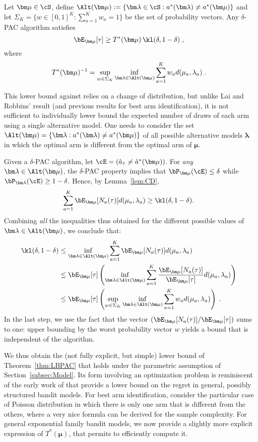 \documentclass[proc]{edpsmath}
\begin{document}
	\begin{theorem}\label{thm:LBPAC} Let $\bm \mu \in \cS$, define $\Alt(\bm \mu) := \{ \bm \lambda \in \cS : a^*(\bm \lambda) \neq a^*(\bm \mu)\}$ and let  $\Sigma_K = \big\{ w \in [0,1]^K : \sum_{a=1}^K w_a =1\big\}$ be the set of probability vectors. Any $\delta$-PAC algorithm satisfies 
		\[\bE_{\bm \mu}[\tau] \geq T^*(\bm \mu)\, \kl(\delta,1-\delta)\;,\]
		where
		\[T^*(\bm \mu)^{-1} = \sup_{w \in \Sigma_K} \inf_{\bm \lambda \in \Alt(\bm \mu)} \sum_{a=1}^K w_a d (\mu_a,\lambda_a)\;.\]
	\end{theorem}
	
	This lower bound against relies on a change of distribution, but unlike Lai and Robbins' result (and previous results for best arm identification), it is not sufficient to individually lower bound the expected number of draws of each arm using a single alternative model. One needs to consider the set $\Alt(\bm\mu) = \{\bm \lambda : a^*(\bm \lambda)\neq a^*(\bm\mu)\}$ of all possible alternative models $\bm \lambda$ in which the optimal arm is different from the optimal arm of $\bm\mu$.
	
	Given a $\delta$-PAC algorithm, let $\cE = (\hat{a}_\tau \neq \hat{a}^*(\bm \mu))$.
	For \emph{any} $\bm\lambda \in \Alt(\bm\mu)$, the $\delta$-PAC property implies that $\bP_{\bm\mu}(\cE) \leq \delta$ while $\bP_{\bm \lambda}(\cE) \geq 1-\delta$. Hence, by Lemma~\ref{lem:CD},
	\[\sum_{a=1}^K \bE_{\bm\mu}[N_a(\tau)] d(\mu_a,\lambda_a) \geq \kl(\delta,1-\delta).\]
	Combining \emph{all} the inequalities thus obtained for the different possible values of $\bm\lambda \in \Alt(\bm\mu)$, we conclude that:
	\begin{align*}
		\kl(\delta,1-\delta) &\leq  \inf_{\bm \lambda \in \Alt(\bm\mu)}\sum_{a=1}^K \bE_{\bm\mu}[N_a(\tau)] d(\mu_a,\lambda_a)\\
		&\leq 
		\bE_{\bm\mu}[\tau]\left(\inf_{\bm \lambda \in \Alt(\bm\mu)}\sum_{a=1}^K \frac{\bE_{\bm\mu}[N_a(\tau)]}{\bE_{\bm\mu}[\tau]} d(\mu_a,\lambda_a)\right)\\
		&\leq 
		\bE_{\bm\mu}[\tau]\left(\sup_{w \in \Sigma_K}\inf_{\bm \lambda \in \Alt(\bm\mu)}\sum_{a=1}^K w_a d(\mu_a,\lambda_a)\right) \;.
	\end{align*}
	In the last step, we use the fact that the vector $(\bE_{\bm\mu}[N_a(\tau)]/\bE_{\bm\mu}[\tau])$ sums to one: upper bounding by the worst probability vector $w$ yields a bound that is independent of the algorithm.
	
	We thus obtain the (not fully explicit, but simple) lower bound of Theorem~\ref{thm:LBPAC} that holds under the parametric assumption of Section~\ref{subsec:Model}. Its form involving an optimization problem is reminiscent of the early work of \cite{Agrawaletal89LBGene,GravesLai97} that provide a lower bound on the regret in general, possibly structured bandit models. For best arm identification, \cite{Rajesh15Oddball} consider the particular case of Poisson distribution in which there is only one arm that is different from the others, where a very nice formula can be derived for the sample complexity. For general exponential family bandit models, we now provide a slightly more explicit expression of $T^*(\bm\mu)$, that permits to efficiently compute it. 
	
\end{document}
